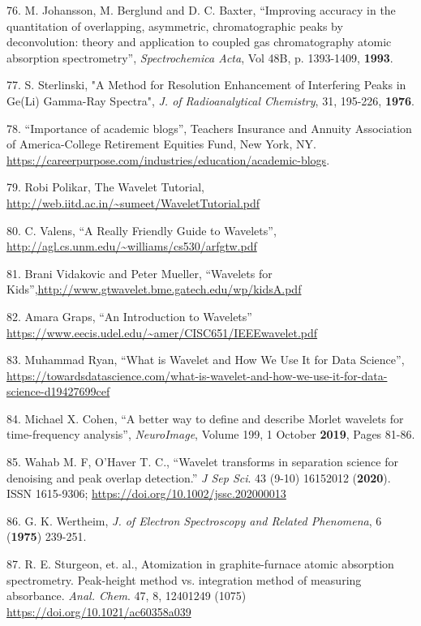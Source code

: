 76. M. Johansson, M. Berglund and D. C. Baxter, ``Improving accuracy in the quantitation of overlapping, asymmetric, chromatographic peaks by deconvolution: theory and application to coupled gas chromatography atomic absorption spectrometry'', \textit{Spectrochemica Acta}, Vol 48B, p. 1393-1409, \textbf{1993}.

77. S. Sterlinski, "A Method for Resolution Enhancement of Interfering Peaks in Ge(Li) Gamma-Ray Spectra", \textit{J. of Radioanalytical Chemistry}, 31, 195-226, \textbf{1976}.

78. ``Importance of academic blogs'', Teachers Insurance and Annuity Association of America-College Retirement Equities Fund, New York, NY. \url{https://careerpurpose.com/industries/education/academic-blogs}.

79. Robi Polikar, The Wavelet Tutorial, \url{http://web.iitd.ac.in/~sumeet/WaveletTutorial.pdf}

80. C. Valens, ``A Really Friendly Guide to Wavelets'', \url{http://agl.cs.unm.edu/~williams/cs530/arfgtw.pdf}

81. Brani Vidakovic and Peter Mueller, ``Wavelets for Kids'',\url{http://www.gtwavelet.bme.gatech.edu/wp/kidsA.pdf} 

82. Amara Graps, ``An Introduction to Wavelets'' \url{https://www.eecis.udel.edu/~amer/CISC651/IEEEwavelet.pdf}

83. Muhammad Ryan, ``What is Wavelet and How We Use It for Data Science'', \url{https://towardsdatascience.com/what-is-wavelet-and-how-we-use-it-for-data-science-d19427699cef}

84. \textcolor{color-23}{Michael X.} \textcolor{color-23}{Cohen}, ``A better way to define and describe Morlet wavelets for time-frequency analysis'', \textit{NeuroImage}, Volume 199, 1 October \textbf{2019}, Pages 81-86. 

85. Wahab M. F, O’Haver T. C., ``Wavelet transforms in separation science for denoising and peak overlap detection.'' \textit{J Sep Sci}. 43 (9-10) 1615\textendash{}2012 (\textbf{2020}). ISSN 1615-9306; \url{https://doi.org/10.1002/jssc.202000013}

86. G. K. Wertheim, \textit{J. of Electron Spectroscopy and Related Phenomena}, 6 (\textbf{1975}) 239-251.

87. R. E. Sturgeon, et. al., Atomization in graphite-furnace atomic absorption spectrometry. Peak-height method vs. integration method of measuring absorbance. \textit{Anal. Chem}. 47, 8, 1240\textendash{}1249 (1075) \url{https://doi.org/10.1021/ac60358a039}

